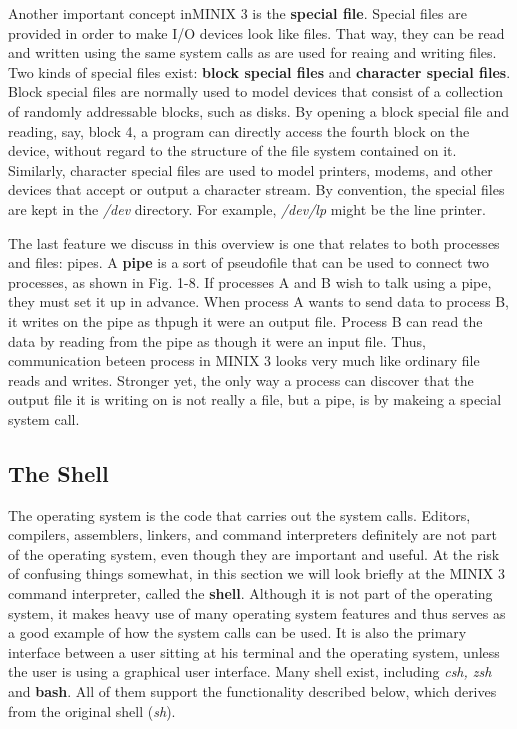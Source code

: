 \documentclass{book}
\newcommand {\kw}  [1] {\textbf{#1}}
\newcommand {\sys} [1] {\textsl{#1}}
\begin{document}
Another important concept inMINIX 3 is the \kw{special file}.
Special files are provided in order to make I/O devices look like files.
That way, they can be read and written using the same system calls as are used for reaing and writing files.
Two kinds of special files exist: \kw{block special files} and \kw{character special files}.
Block special files are normally used to model devices that consist of a collection of randomly addressable blocks, such as disks.
By opening a block special file and reading, say, block 4, a program can directly access the fourth block on the device, 
without regard to the structure of the file system contained on it.
Similarly, character special files are used to model printers, modems, and other devices that accept or output a character stream.
By convention, the special files are kept in the \sys{/dev} directory.
For example, \sys{/dev/lp} might be the line printer.

The last feature we discuss in this overview is one that relates to both processes and files: pipes.
A \kw{pipe} is a sort of pseudofile that can be used to connect two processes, as shown in Fig. 1-8.
If processes A and B wish to talk using a pipe, they must set it up in advance.
When process A wants to send data to process B, it writes on the pipe as thpugh it were an output file.
Process B can read the data by reading from the pipe as though it were an input file.
Thus, communication beteen process in MINIX 3 looks very much like ordinary file reads and writes.
Stronger yet, the only way a process can discover that the output file it is writing on is not really a file, 
but a pipe, is by makeing a special system call.

\subsection{The Shell}
The operating system is the code that carries out the system calls.
Editors, compilers, assemblers, linkers, and command interpreters definitely are not part of the operating system, 
even though they are important and useful.
At the risk of confusing things somewhat, in this section we will look briefly at the MINIX 3 command interpreter, called the \kw{shell}.
Although it is not part of the operating system, it makes heavy use of many operating system features 
and thus serves as a good example of how the system calls can be used.
It is also the primary interface between a user sitting at his terminal and the operating system, 
unless the user is using a graphical user interface.
Many shell exist, including \sys{csh, zsh} and \kw{bash}.
All of them support the functionality described below, which derives from the original shell (\sys{sh}).
\end{document}
